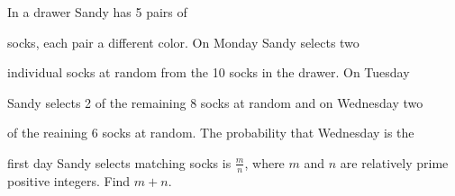 In a drawer Sandy has 5 pairs of 

socks, each pair a different color. On Monday Sandy selects two 

individual socks at random from the 10 socks in the drawer. On Tuesday 

Sandy selects 2 of the remaining 8 socks at random and on Wednesday two 

of the reaining 6 socks at random. The probability that Wednesday is the

 first day Sandy selects matching socks is $\tfrac{m}{n}$,  where $m$ and $n$ are relatively prime positive integers. Find $m+n$.